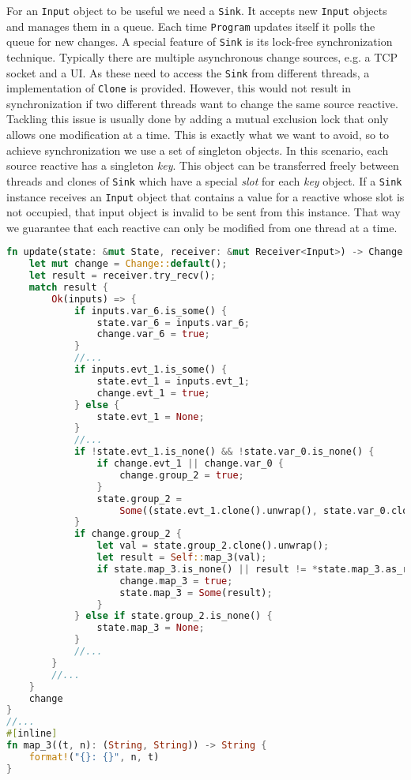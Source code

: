 For an \lstinline{Input} object to be useful we need a \lstinline{Sink}. It accepts new \lstinline{Input} objects and manages them in a queue. Each time \lstinline{Program} updates itself it polls the queue for new changes. A special feature of \lstinline{Sink} is its lock-free synchronization technique. Typically there are multiple asynchronous change sources, e.g. a TCP socket and a \ac{UI}. As these need to access the \lstinline{Sink} from different threads, a implementation of \lstinline{Clone} is provided. However, this would not result in synchronization if two different threads want to change the same source reactive. Tackling this issue is usually done by adding a mutual exclusion lock that only allows one modification at a time. This is exactly what we want to avoid, so to achieve synchronization we use a set of singleton objects. In this scenario, each source reactive has a singleton \emph{key}. This object can be transferred freely between threads and clones of \lstinline{Sink} which have a special \emph{slot} for each \emph{key} object. If a \lstinline{Sink} instance receives an \lstinline{Input} object that contains a value for a reactive whose slot is not occupied, that input object is invalid to be sent from this instance. That way we guarantee that each reactive can only be modified from one thread at a time.

\begin{lstlisting}[language=Rust,style=colouredRust,caption=Program::update() function,label=lst:update-fn]
fn update(state: &mut State, receiver: &mut Receiver<Input>) -> Change {
    let mut change = Change::default();
    let result = receiver.try_recv();
    match result {
        Ok(inputs) => {
            if inputs.var_6.is_some() {
                state.var_6 = inputs.var_6;
                change.var_6 = true;
            }
            //...
            if inputs.evt_1.is_some() {
                state.evt_1 = inputs.evt_1;
                change.evt_1 = true;
            } else {
                state.evt_1 = None;
            }
            //...
            if !state.evt_1.is_none() && !state.var_0.is_none() {
                if change.evt_1 || change.var_0 {
                    change.group_2 = true;
                }
                state.group_2 =
                    Some((state.evt_1.clone().unwrap(), state.var_0.clone().unwrap()));
            }
            if change.group_2 {
                let val = state.group_2.clone().unwrap();
                let result = Self::map_3(val);
                if state.map_3.is_none() || result != *state.map_3.as_ref().unwrap() {
                    change.map_3 = true;
                    state.map_3 = Some(result);
                }
            } else if state.group_2.is_none() {
                state.map_3 = None;
            }
            //...
        }
        //...
    }
    change
}
//...
#[inline]
fn map_3((t, n): (String, String)) -> String {
    format!("{}: {}", n, t)
}
\end{lstlisting}


